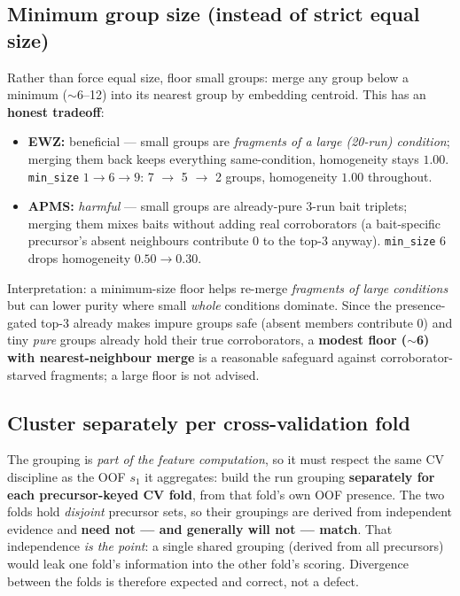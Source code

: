 \documentclass[11pt]{article}
\newcommand{\code}[1]{\texttt{\small #1}}
\begin{document}
\subsection{Minimum group size (instead of strict equal size)}
Rather than force equal size, floor small groups: merge any group below a minimum ($\sim$6--12) into
its nearest group by embedding centroid. This has an \textbf{honest tradeoff}:
\begin{itemize}[nosep]
  \item \textbf{EWZ:} beneficial --- small groups are \emph{fragments of a large (20-run) condition};
  merging them back keeps everything same-condition, homogeneity stays $1.00$. \code{min\_size}
  $1\!\to\!6\!\to\!9$: 7 $\to$ 5 $\to$ 2 groups, homogeneity $1.00$ throughout.
  \item \textbf{APMS:} \emph{harmful} --- small groups are already-pure 3-run bait triplets; merging
  them mixes baits without adding real corroborators (a bait-specific precursor's absent neighbours
  contribute $0$ to the top-3 anyway). \code{min\_size} $6$ drops homogeneity $0.50\!\to\!0.30$.
\end{itemize}
Interpretation: a minimum-size floor helps re-merge \emph{fragments of large conditions} but can
lower purity where small \emph{whole} conditions dominate. Since the presence-gated top-3 already
makes impure groups safe (absent members contribute $0$) and tiny \emph{pure} groups already hold
their true corroborators, a \textbf{modest floor ($\sim$6) with nearest-neighbour merge} is a
reasonable safeguard against corroborator-starved fragments; a large floor is not advised.

\subsection{Cluster separately per cross-validation fold}
The grouping is \emph{part of the feature computation}, so it must respect the same CV discipline as
the OOF $s_1$ it aggregates: build the run grouping \textbf{separately for each precursor-keyed CV
fold}, from that fold's own OOF presence. The two folds hold \emph{disjoint} precursor sets, so their
groupings are derived from independent evidence and \textbf{need not --- and generally will not ---
match}. That independence \emph{is the point}: a single shared grouping (derived from all precursors)
would leak one fold's information into the other fold's scoring. Divergence between the folds is
therefore expected and correct, not a defect.
\end{document}
